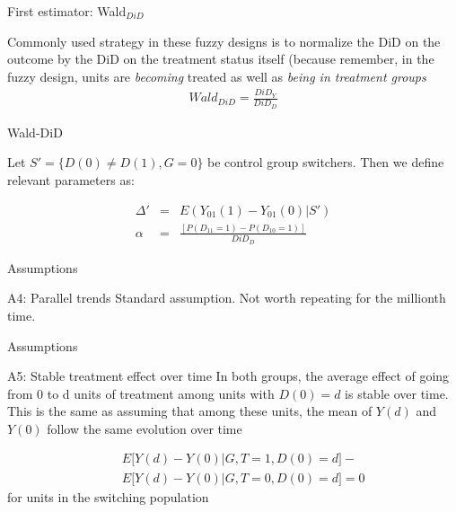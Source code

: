 \documentclass{beamer}
\begin{document}
\begin{frame}{First estimator: Wald$_{DiD}$}

Commonly used strategy in these fuzzy designs is to normalize the DiD on the outcome by the DiD on the treatment status itself (because remember, in the fuzzy design, units are \emph{becoming} treated as well as \emph{being in treatment groups} \\

\begin{eqnarray*}
Wald_{DiD} = \frac{DiD_Y}{DiD_D}
\end{eqnarray*}

\bigskip



\end{frame}


\begin{frame}{Wald-DiD}

Let $S'= \{ D(0) \neq D(1), G=0 \}$ be control group switchers.  Then we define relevant parameters as:

\begin{eqnarray*}
\Delta ' &=& E(Y_{01}(1) - Y_{01}(0) | S') \\
\alpha &=& \frac{
[P(D_{11}=1) - P(D_{10}=1)]}{DiD_D}
\end{eqnarray*}

\end{frame}

\begin{frame}{Assumptions}

\begin{block}{A4: Parallel trends}
Standard assumption. Not worth repeating for the millionth time.
\end{block}

\end{frame}

\begin{frame}{Assumptions}

\begin{block}{A5: Stable treatment effect over time}
In both groups, the average effect of going from 0 to d units of treatment among units with $D(0)=d$  is stable over time.  This is the same as assuming that among these units, the mean of $Y(d)$ and $Y(0)$ follow the same evolution over time
\end{block}

\begin{eqnarray*}
&&E \bigg [ Y(d) - Y(0) | G, T=1, D(0) = d \bigg ] -\\
&& E \bigg [Y(d) - Y(0) | G, T=0, D(0)=d \bigg ] =0
\end{eqnarray*}for units in the switching population

\end{frame}
\end{document}
